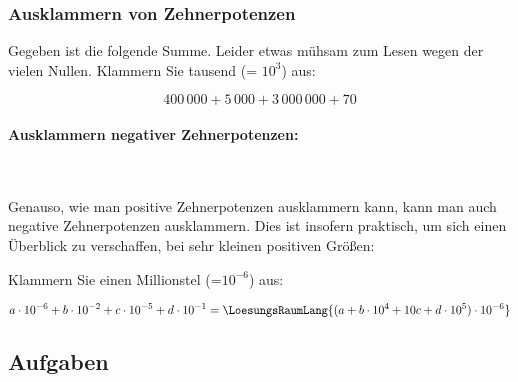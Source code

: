 

\newpage


\subsubsection{Ausklammern von Zehnerpotenzen}
Gegeben ist die folgende Summe. Leider etwas mühsam zum Lesen wegen der vielen Nullen. Klammern Sie tausend (= $10^3$) aus:

$$400\,000 + 5\,000 + 3\,000\,000 + 70$$


\paragraph{Ausklammern negativer Zehnerpotenzen:}
\,

\vspace{1mm}

Genauso, wie man positive Zehnerpotenzen ausklammern kann, kann man auch negative Zehnerpotenzen ausklammern. Dies ist insofern praktisch, um sich einen Überblick zu verschaffen, bei sehr kleinen positiven Größen:

Klammern Sie einen Millionstel (=$10^{-6}$) aus:


$$a\cdot{}10^{-6} + b\cdot{}10^{-2} + c\cdot{}10^{-5} +
d\cdot{}10^{-1} = \LoesungsRaumLang{(a + b\cdot{}10^4 + 10c + d\cdot{}10^{5}) \cdot{} 10^{-6}}$$

\subsection*{Aufgaben}





\newpage
